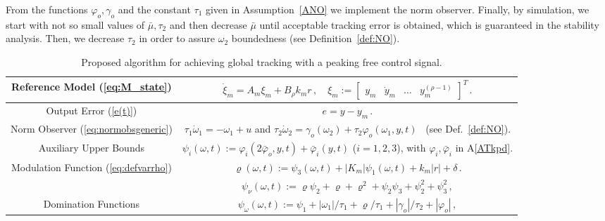 \documentclass{rncauth}
\begin{document}
From the functions $\varphi_o, \gamma_o$ and the constant $\tau_1$
given in Assumption~\ref{ANO} we implement the norm observer.
Finally, by simulation, we start with not so small values of
$\bar{\mu},\tau_2$ and then decrease $\bar{\mu}$ until acceptable
tracking error is obtained, which is guaranteed in the stability
analysis. Then, we decrease $\tau_2$ in order to assure $\omega_2$
boundedness (see Definition~\ref{def:NO}).
%
\begin{table*}[thbl]%
\caption{Proposed algorithm for achieving global tracking with a
peaking free control signal.}
\renewcommand {\arraystretch}{1.7}
  \begin{center}
  \label{HGO:tab:peaking_free_VS-MRAC}
\vspace{2mm}
\begin{small}
  \begin{tabular}{|c|c|}
     \hline
     Reference Model  (\ref{eq:M_state})   & $ \dot{\xi}_m =  A_m \xi_m + B_\rho k_m r\,,
     \quad \xi_m\!:=\![\begin{array}{cccc}y_m & \dot{y}_m & \ldots & y_m^{(\rho-1)}\end{array}]^T\,.$\\%

     \hline
     Output Error  (\ref{e(t)})     & $e = y - y_m\,.$ \\
     \hline



     Norm Observer  (\ref{eq:normobsgeneric})      & $\tau_1 \dot{\omega}_1 = - \omega_1 + u$ and $\tau_2\dot{\omega}_2 =  \gamma_o(\omega_2)+\tau_2\varphi_o(\omega_1,y,t)$ ~(see Def.~\ref{def:NO}). \\%
     \hline



 Auxiliary Upper Bounds   & $\psi_i(\omega,t):=\varphi_i(2\bar{\varphi}_o,y,t)+\bar{\varphi}_i(y,t)$
($i=1,2,3$), with $\varphi_i, \bar{\varphi}_i$ in
A\ref{ATkpd}. \\ \hline

     Modulation Function  (\ref{eq:defvarrho}) & $\varrho(\omega,t):=\psi_3(\omega,t)+|K_m| \psi_1(\omega,t)+k_m |r|+ \delta\,.$\\
     \hline


 & $\psi_\nu(\omega,t):=\varrho \psi_2+ \varrho+
\varrho^2+\psi_2\psi_3+\psi_2^2 + \psi_3^2\,,$\\

Domination Functions & $\psi_\omega(\omega,t):=\psi_1 +
|\omega_1|/\tau_1 +
\varrho/\tau_1 + |\gamma_o|/\tau_2+|\varphi_o|\,,$\\


\end{tabular}
\end{small}
\end{center}
\end{table*}
\end{document}
